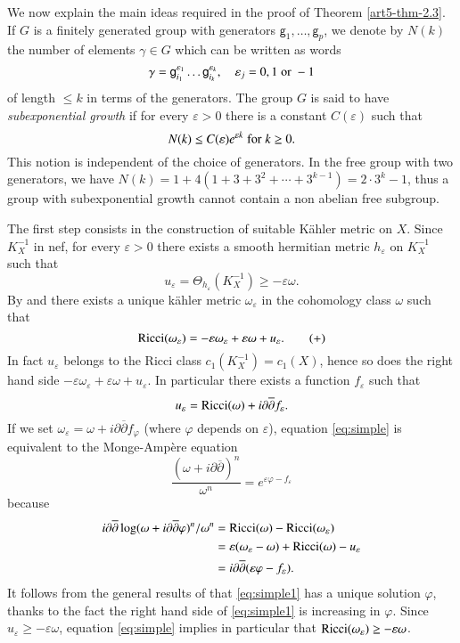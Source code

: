 We now explain the main ideas required in the proof of Theorem \ref{art5-thm-2.3}. If $G$ is a finitely generated group with generators $\mathsf{g}_{1},\ldots, \mathsf{g}_{p}$, we denote by $N(k)$ the number of elements $\gamma \in G$ which can be written as words
$$
\gamma = \mathsf{g}_{i_{1}}^{\varepsilon_{1}}\ldots\mathsf{g}_{i_{k}}^{\varepsilon_{k}}, \quad \varepsilon_{j} = 0, 1 \; \text{\rm or} \; -1
$$
of length $\leq k$ in terms of the generators. The group $G$ is said to have \textit{subexponential growth} if for every $\varepsilon > 0$ there is a constant $C(\varepsilon)$ such that
$$
N(k) \leq C(\varepsilon)e^{\varepsilon k}\; \text{\rm for} \; k\geq 0.
$$
This notion is independent of the choice of generators. In the free group with two generators, we have $N(k) = 1+4(1+3+3^{2}+\cdots + 3^{k-1}) =2 \cdot 3^{k} - 1$, thus a group with subexponential growth cannot contain a non abelian free subgroup.

The first step consists in the construction of suitable K\"ahler metric on $X$. Since $K_{X}^{-1}$ in nef, for every $\varepsilon > 0$ there exists a smooth hermitian metric $h_{\varepsilon}$ on $K_{X}^{-1}$ such that
$$
u_{\varepsilon} = \Theta _{h_{\varepsilon}}(K_{X}^{-1}) \geq -\varepsilon\omega.
$$
By \cite{art5-keyY77} and \cite{art5-keyY78} there exists a unique k\"ahler metric $\omega_{\varepsilon}$ in the cohomology class ${\omega}$ such that
\begin{equation}
\operatorname{Ricci}(\omega_{\varepsilon}) = -\varepsilon\omega_{\varepsilon} + \varepsilon\omega + u_{\varepsilon}.\tag{+}\label{eq:simple}
\end{equation}
In fact $u_{\varepsilon}$ belongs to the Ricci class $c_{1}(K_{X}^{-1}) = c_{1}(X)$, hence so does the right hand side $-\varepsilon\omega_{\varepsilon} + \varepsilon\omega + u_{\varepsilon}$. In particular there exists a function $f_{\varepsilon}$ such that
$$
u_{\varepsilon} = \operatorname{Ricci}(\omega) + i \partial\overline{\partial}f_{\varepsilon}.
$$
If we set $\omega_{\varepsilon} = \omega + i \partial\overline{\partial}f_{\varphi}$ (where $\varphi$ depends on $\varepsilon$), equation \eqref{eq:simple} is equivalent to the Monge-Amp\`ere equation
\begin{equation}
\dfrac{\left(\omega + i \partial \overline\partial\right)^{n}}{\omega^{n}} = e^{\varepsilon\varphi-f_{\varepsilon}}\tag{++}\label{eq:simple1}
\end{equation}
because
\begin{align*}
i\partial\overline\partial\log(\omega + i \partial\overline\partial \varphi)^{n}/\omega^{n} &= \operatorname{Ricci}(\omega) - \operatorname{Ricci}(\omega_{\varepsilon})\\
&=\varepsilon(\omega_{\varepsilon} - \omega) + \operatorname{Ricci}(\omega) - u_{\varepsilon}\\
&= i\partial\overline\partial(\varepsilon \varphi - f_{\varepsilon}).
\end{align*}
It follows from the general results of \cite{art5-keyY78} that \eqref{eq:simple1} has a unique solution $\varphi$, thanks to the fact the right hand side of \eqref{eq:simple1} is increasing in $\varphi$. Since $u_{\varepsilon} \geq -\varepsilon\omega$, equation \eqref{eq:simple} implies in particular that $\operatorname{Ricci}(\omega_{\varepsilon}) \geq -\varepsilon \omega$.

